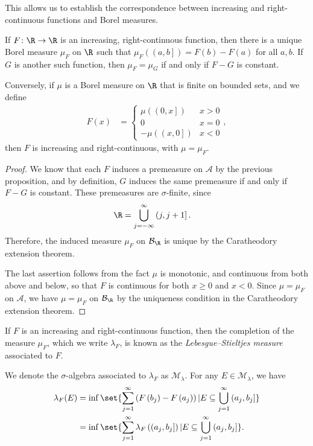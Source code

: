 \documentclass[10pt]{mypackage}
\begin{document}
This allows us to establish the correspondence between increasing and right-continuous functions and Borel measures.
\begin{theorem}
If $F\colon \R\rightarrow \R$ is an increasing, right-continuous function, then there is a unique Borel measure $\mu_F$ on $\R$ such that $\mu_F\left( \left( a,b \right] \right) = F(b) - F(a)$ for all $a,b$. If $G$ is another such function, then $\mu_F = \mu_G$ if and only if $F-G$ is constant.\newline

Conversely, if $\mu$ is a Borel measure on $\R$ that is finite on bounded sets, and we define
\begin{align*}
  F(x) &= \begin{cases}
    \mu\left( \left( 0,x \right] \right) & x > 0\\
    0 & x = 0\\
    -\mu\left( \left( x,0 \right] \right) & x < 0
  \end{cases},
\end{align*}
then $F$ is increasing and right-continuous, with $\mu = \mu_F$.
\end{theorem}
\begin{proof}
  We know that each $F$ induces a premeasure on $\mathcal{A}$ by the previous proposition, and by definition, $G$ induces the same premeasure if and only if $F-G$ is constant. These premeasures are $\sigma$-finite, since
  \begin{align*}
    \R &= \bigcup_{j=-\infty}^{\infty}\left( j,j+1 \right].
  \end{align*}
  Therefore, the induced measure $\mu_F$ on $\mathcal{B}_{\R}$ is unique by the Caratheodory extension theorem.\newline

  The last assertion follows from the fact $\mu$ is monotonic, and continuous from both above and below, so that $F$ is continuous for both $x \geq 0$ and $x < 0$. Since $\mu = \mu_F$ on $\mathcal{A}$, we have $\mu = \mu_F$ on $\mathcal{B}_{\R}$ by the uniqueness condition in the Caratheodory extension theorem.
\end{proof}
\begin{definition}
  If $F$ is an increasing and right-continuous function, then the completion of the measure $\mu_F$, which we write $\lambda_F$, is known as the \textit{Lebesgue--Stieltjes measure} associated to $F$.\newline

  We denote the $\sigma$-algebra associated to $\lambda_F$ as $\mathcal{M}_{\lambda}$. For any $E\in \mathcal{M}_{\lambda}$, we have
  \begin{align*}
    \lambda_F(E) &= \inf\set{\sum_{j=1}^{\infty}\left( F\left( b_j \right)-F\left( a_j \right) \right) | E\subseteq \bigcup_{j=1}^{\infty}\left( a_j,b_j \right]}\\
                 &= \inf\set{\sum_{j=1}^{\infty}\lambda_F\left( \left( a_j,b_j \right] \right) | E\subseteq \bigcup_{j=1}^{\infty}\left( a_j,b_j \right]}.
  \end{align*}
\end{definition}
\end{document}
